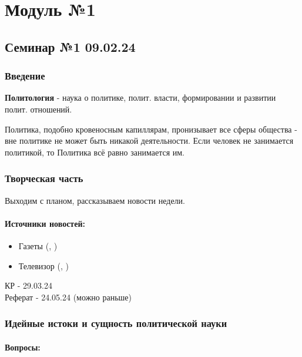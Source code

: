 \part{Модуль №1}

\chapter{Семинар №1 09.02.24}

\section{Введение}

\textbf{Политология} - наука о политике, полит. власти, формировании и развитии полит. отношений.

Политика, подобно кровеносным капиллярам, пронизывает все сферы общества - вне политике не может быть никакой деятельности.
Если человек не занимается политикой, то Политика всё равно занимается им.

\section{Творческая часть}

Выходим с планом, рассказываем новости недели.

\subsection*{Источники новостей:}
\begin{itemize}
  \item Газеты (, )
  \item Телевизор (, )
\end{itemize}

КР - 29.03.24 \\
Реферат - 24.05.24 (можно раньше)

\section{Идейные истоки и сущность политической науки}

\subsection*{Вопросы:}


